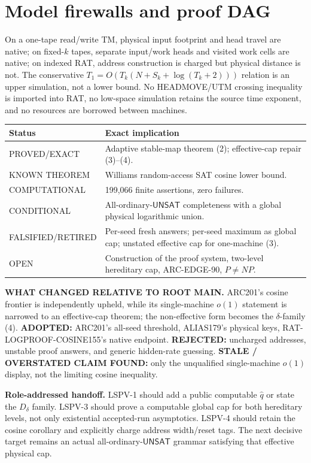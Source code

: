 \documentclass[11pt]{article}
\newcommand{\UNSAT}{\mathsf{UNSAT}}
\begin{document}
\section{Model firewalls and proof DAG}
On a one-tape read/write TM, physical input footprint and head travel are
native; on fixed-$k$ tapes, separate input/work heads and visited work cells
are native; on indexed RAT, address construction is charged but physical
distance is not.  The conservative
$T_1=O(T_k(N+S_k+\log(T_k+2)))$ relation is an upper simulation, not a lower
bound.  No HEADMOVE/UTM crossing inequality is imported into RAT, no low-space
simulation retains the source time exponent, and no resources are borrowed
between machines.

\begin{center}\small
\begin{tabularx}{.95\linewidth}{p{.20\linewidth}X}\toprule
Status & Exact implication\\\midrule
PROVED/EXACT & Adaptive stable-map theorem (2); effective-cap repair (3)--(4).\\
KNOWN THEOREM & Williams random-access SAT cosine lower bound.\\
COMPUTATIONAL & 199,066 finite assertions, zero failures.\\
CONDITIONAL & All-ordinary-$\UNSAT$ completeness with a global physical logarithmic union.\\
FALSIFIED/RETIRED & Per-seed fresh answers; per-seed maximum as global cap; unstated effective cap for one-machine (3).\\
OPEN & Construction of the proof system, two-level hereditary cap, ARC-EDGE-90, $P\ne NP$.\\\bottomrule
\end{tabularx}\end{center}

\textbf{WHAT CHANGED RELATIVE TO ROOT MAIN.} ARC201's cosine frontier is
independently upheld, while its single-machine $o(1)$ statement is narrowed
to an effective-cap theorem; the non-effective form becomes the
$\delta$-family (4).  \textbf{ADOPTED:} ARC201's all-seed threshold,
ALIAS179's physical keys, RAT-LOGPROOF-COSINE155's native endpoint.
\textbf{REJECTED:} uncharged addresses, unstable proof answers, and generic
hidden-rate guessing.  \textbf{STALE / OVERSTATED CLAIM FOUND:} only the
unqualified single-machine $o(1)$ display, not the limiting cosine inequality.

\textbf{Role-addressed handoff.} LSPV-1 should add a public computable
$\widehat q$ or state the $D_\delta$ family.  LSPV-3 should prove a computable
global cap for both hereditary levels, not only existential accepted-run
asymptotics.  LSPV-4 should retain the cosine corollary and explicitly charge
address width/reset tags.  The next decisive target remains an actual
all-ordinary-$\UNSAT$ grammar satisfying that effective physical cap.
\end{document}
